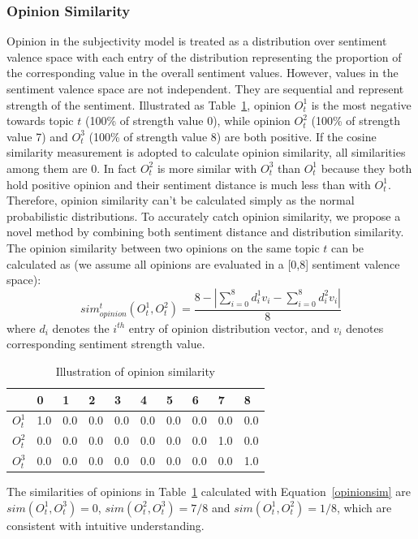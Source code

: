 \documentclass{acm_proc_article-sp}
\begin{document}
\subsubsection{Opinion Similarity}
\label{opsim}

Opinion in the subjectivity model is treated  as a distribution over sentiment valence space with each entry of the distribution representing the proportion of the corresponding value in the overall sentiment values. 
However, values in the sentiment valence space are not independent. 
They are sequential and represent strength of the sentiment. Illustrated as Table~\ref{tab1}, opinion $ O_{t}^{1} $ is the most negative towards topic $ t $ (100\% of strength value 0), while opinion $ O_{t}^{2} $ (100\% of strength value 7) and $ O_{t}^{3} $ (100\% of strength value 8) are both positive.
If the cosine similarity measurement is adopted to calculate opinion similarity, all similarities among them are 0.
In fact $ O_{t}^{2} $ is more similar with $ O_{t}^{3} $ than $O_{t}^{1} $ because they both hold positive opinion and their sentiment distance is much less than with $ O_{t}^{1} $.  
Therefore, opinion similarity can't be calculated simply as the normal probabilistic distributions. 
To accurately catch opinion similarity, we propose a novel method by combining both sentiment distance and distribution similarity.
The opinion similarity between two opinions on the same topic $ t $ can be calculated as (we assume all opinions are evaluated in a [0,8] sentiment valence space): 
\begin{equation}
\label{opinionsim}
sim_{opinion}^{t}(O_{t}^{1},O_{t}^{2})=\dfrac{8-|\sum_{i=0}^{8}d_{i}^{1}v_{i}-\sum_{i=0}^{8}d_{i}^{2}v_{i}|}{8}
\end{equation}
where $ d_{i} $ denotes the $ i^{th} $ entry of opinion distribution vector, and $ v_{i} $ denotes corresponding sentiment strength value. 
\begin{table}[htb]
\scriptsize
\centering
\caption{Illustration of opinion similarity}
\label{tab1}
\begin{tabular}{|l|l|l|l|l|l|l|l|l|l|}
\hline
 & 0 & 1& 2 & 3 & 4 & 5 & 6 & 7 & 8 \\
\hline
$O_{t}^{1}$ & 1.0 & 0.0 & 0.0 & 0.0 & 0.0 & 0.0 & 0.0 & 0.0 & 0.0 \\
\hline
$O_{t}^{2}$ & 0.0 & 0.0 & 0.0 & 0.0 & 0.0 & 0.0 & 0.0 & 1.0 & 0.0 \\
\hline
$O_{t}^{3}$ & 0.0 & 0.0 & 0.0 & 0.0 & 0.0 & 0.0 & 0.0 & 0.0 & 1.0 \\
\hline
\end{tabular}
\end{table} 
The similarities of opinions in Table~\ref{tab1} calculated with Equation~\ref{opinionsim} are $ sim(O_{t}^{1},O_{t}^{3})=0 $, $ sim(O_{t}^{2},O_{t}^{3})=7/8 $ and $ sim(O_{t}^{1},O_{t}^{2})=1/8 $, which are consistent with intuitive understanding. 
\end{document}
